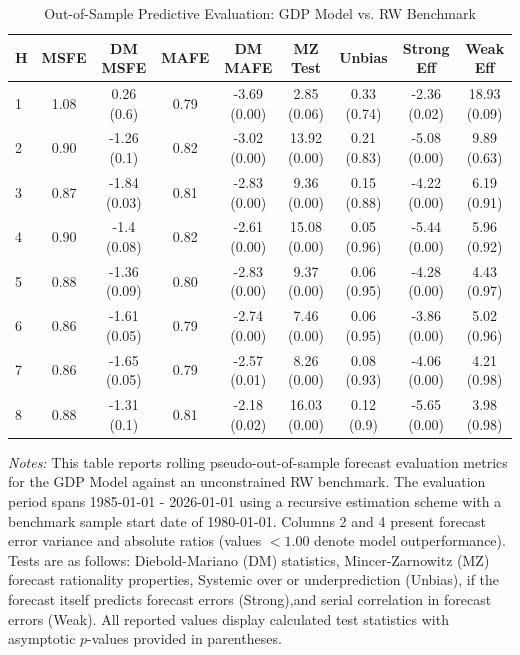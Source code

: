 \begin{table}[htbp]
\centering
\caption{Out-of-Sample Predictive Evaluation: GDP Model vs. RW Benchmark}
\label{tab:gdp_model_evaluation}
\footnotesize
\begin{tabular}{l cccccccc}
\hline\hline
\rule{0pt}{3ex}
\textbf{H} & \textbf{MSFE} & \textbf{DM MSFE} & \textbf{MAFE} & \textbf{DM MAFE} & \textbf{MZ Test} & \textbf{Unbias} & \textbf{Strong Eff} & \textbf{Weak Eff} \\[0.5ex]
\hline
\rule{0pt}{2.5ex}
1 & 1.08 & 0.26 (0.6) & 0.79 & -3.69 (0.00) & 2.85 (0.06) & 0.33 (0.74) & -2.36 (0.02) & 18.93 (0.09) \\
2 & 0.90 & -1.26 (0.1) & 0.82 & -3.02 (0.00) & 13.92 (0.00) & 0.21 (0.83) & -5.08 (0.00) & 9.89 (0.63) \\
3 & 0.87 & -1.84 (0.03) & 0.81 & -2.83 (0.00) & 9.36 (0.00) & 0.15 (0.88) & -4.22 (0.00) & 6.19 (0.91) \\
4 & 0.90 & -1.4 (0.08) & 0.82 & -2.61 (0.00) & 15.08 (0.00) & 0.05 (0.96) & -5.44 (0.00) & 5.96 (0.92) \\
5 & 0.88 & -1.36 (0.09) & 0.80 & -2.83 (0.00) & 9.37 (0.00) & 0.06 (0.95) & -4.28 (0.00) & 4.43 (0.97) \\
6 & 0.86 & -1.61 (0.05) & 0.79 & -2.74 (0.00) & 7.46 (0.00) & 0.06 (0.95) & -3.86 (0.00) & 5.02 (0.96) \\
7 & 0.86 & -1.65 (0.05) & 0.79 & -2.57 (0.01) & 8.26 (0.00) & 0.08 (0.93) & -4.06 (0.00) & 4.21 (0.98) \\
8 & 0.88 & -1.31 (0.1) & 0.81 & -2.18 (0.02) & 16.03 (0.00) & 0.12 (0.9) & -5.65 (0.00) & 3.98 (0.98) \\
\hline\hline
\end{tabular}%
\par\smallskip
\parbox{\textwidth}{\scriptsize \textit{Notes:} This table reports rolling pseudo-out-of-sample forecast evaluation metrics for the GDP Model against an unconstrained RW benchmark. The evaluation period spans 1985-01-01 - 2026-01-01 using a recursive estimation scheme with a benchmark sample start date of 1980-01-01. Columns 2 and 4 present forecast error variance and absolute ratios (values $< 1.00$ denote model outperformance). Tests are as follows: Diebold-Mariano (DM) statistics, Mincer-Zarnowitz (MZ) forecast rationality properties, Systemic over or underprediction (Unbias), if the forecast itself predicts forecast errors (Strong),and serial correlation in forecast errors (Weak). All reported values display calculated test statistics with asymptotic $p$-values provided in parentheses.}
\end{table}
